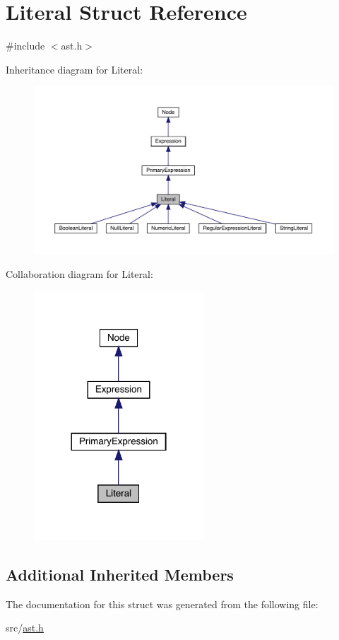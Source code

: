\hypertarget{struct_literal}{}\section{Literal Struct Reference}
\label{struct_literal}


{\ttfamily \#include $<$ast.\+h$>$}



Inheritance diagram for Literal\+:
\nopagebreak
\begin{figure}[H]
\begin{center}
\leavevmode
\includegraphics[width=350pt]{struct_literal__inherit__graph}
\end{center}
\end{figure}


Collaboration diagram for Literal\+:
\nopagebreak
\begin{figure}[H]
\begin{center}
\leavevmode
\includegraphics[width=180pt]{struct_literal__coll__graph}
\end{center}
\end{figure}
\subsection*{Additional Inherited Members}


The documentation for this struct was generated from the following file\+:\begin{DoxyCompactItemize}
\item 
src/\hyperlink{ast_8h}{ast.\+h}\end{DoxyCompactItemize}
